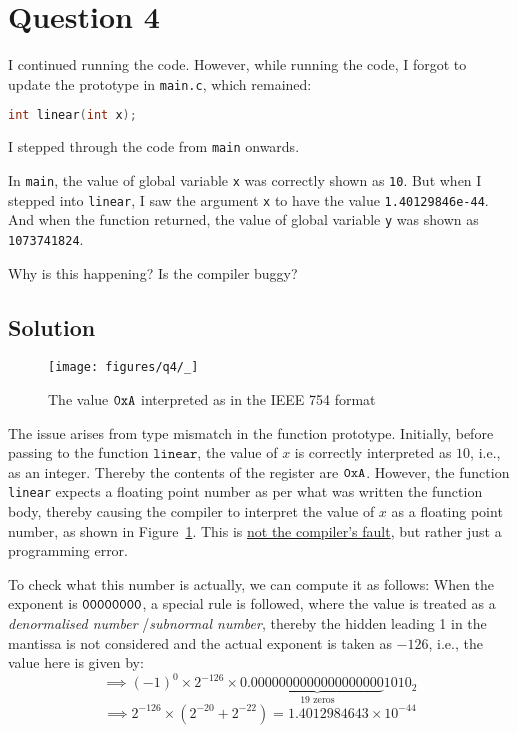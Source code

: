 \section*{Question 4}

I continued running the code.
However, while running the code, I forgot to update the prototype in \texttt{main.c}, which remained:
\begin{lstlisting}[language=C]
int linear(int x);
\end{lstlisting}

I stepped through the code from \texttt{main} onwards.

In \texttt{main}, the value of global variable \texttt{x} was correctly shown as \texttt{10}.
But when I stepped into \texttt{linear}, I saw the argument \texttt{x} to have the value \texttt{1.40129846e-44}.
And when the function returned, the value of global variable \texttt{y} was shown as \texttt{1073741824}.

Why is this happening?
Is the compiler buggy?

\subsection*{Solution}

\begin{figure*}[htbp]
    \centering
    \texttt{[image: figures/q4/\_]}
    \setlength{\abovecaptionskip}{-12pt}
    \caption{
        The value \( \texttt{0xA} \) interpreted as in the IEEE 754 format
    }\label{fig:q4}
\end{figure*}

The issue arises from type mismatch in the function prototype.
Initially, before passing to the function \( \texttt{linear} \), the value of \( x \) is correctly interpreted as \( 10 \), i.e., as an integer.
Thereby the contents of the register are \( \texttt{0xA} \).
However, the function \texttt{linear} expects a floating point number as per what was written the function body, thereby causing the compiler to interpret the value of \( x \) as a floating point number, as shown in Figure~\ref{fig:q4}.
This is \underline{not the compiler's fault}, but rather just a programming error.

To check what this number is actually, we can compute it as follows:
When the exponent is \( \texttt{00000000} \), a special rule is followed, where the value is treated as a \textit{denormalised number} /\textit{subnormal number}, thereby the hidden leading 1 in the mantissa is not considered and the actual exponent is taken as \( -126 \), i.e., the value here is given by:
\[
    \implies
    {(-1)}^0 \times 2^{ -126 } \times 0.\underbrace{0000000000000000000}_{19\text{ zeros}}1010_{2}
\]
\begin{equation*}
    \implies
    2^{ - 126 } \times (2^{-20} + 2^{-22})
    =
    \boxed{
        1.4012984643 \times 10^{-44}
    }
\end{equation*}

